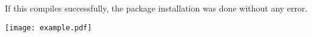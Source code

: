 \documentclass[a4paper,11pt,twoside]{scrartcl}
\begin{document}
If this compiles successfully, the package installation was done without any error.

\texttt{[image: example.pdf]}
\end{document}
